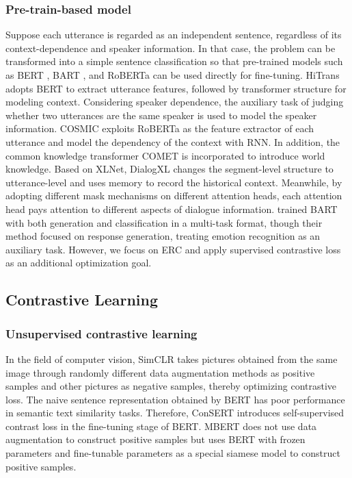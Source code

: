 \documentclass[letterpaper]{article} \usepackage{aaai22}  \usepackage{times}  \usepackage{helvet}  \usepackage{courier}  \usepackage[hyphens]{url}  \usepackage{graphicx} \urlstyle{rm} \def\UrlFont{\rm}  \usepackage{natbib}  \usepackage{caption} \DeclareCaptionStyle{ruled}{labelfont=normalfont,labelsep=colon,strut=off} \frenchspacing  \setlength{\pdfpagewidth}{8.5in}  \setlength{\pdfpageheight}{11in}  \usepackage{algorithm}
\begin{document}
\subsubsection{Pre-train-based model}
Suppose each utterance is regarded as an independent sentence, regardless of its context-dependence and speaker information. In that case, the problem can be transformed into a simple sentence classification so that pre-trained models \cite{ptm_survey} such as BERT \cite{devlin-etal-2019-bert}, BART \cite{lewis-etal-2020-bart}, and RoBERTa \cite{roberta} can be used directly for fine-tuning. HiTrans \cite{li-etal-2020-hitrans} adopts BERT to extract utterance features, followed by transformer structure for modeling context. Considering speaker dependence, the auxiliary task of judging whether two utterances are the same speaker is used to model the speaker information. COSMIC \cite{ghosal-etal-2020-cosmic} exploits RoBERTa as the feature extractor of each utterance and model the dependency of the context with RNN. In addition, the common knowledge transformer COMET \cite{bosse-20-comet} is incorporated to introduce world knowledge. Based on XLNet, DialogXL \cite{dialog-xl} changes the segment-level structure to utterance-level and uses memory to record the historical context. Meanwhile, by adopting different mask mechanisms on different attention heads, each attention head pays attention to different aspects of dialogue information. \citet{gen-and-cls-naacl} trained BART with both generation and classification in a multi-task format, though their method focused on response generation, treating emotion recognition as an auxiliary task. However, we focus on ERC and apply supervised contrastive loss as an additional optimization goal.


\subsection{Contrastive Learning}
\subsubsection{Unsupervised contrastive learning}
In the field of computer vision, SimCLR \cite{ChenK0H20-simclr} takes pictures obtained from the same image through randomly different data augmentation methods as positive samples and other pictures as negative samples, thereby optimizing contrastive loss. The naive sentence representation obtained by BERT has poor performance in semantic text similarity tasks. Therefore, ConSERT \cite{YanLWZWX20-consert} introduces self-supervised contrast loss in the fine-tuning stage of BERT. MBERT \cite{kim-21-mbert} does not use data augmentation to construct positive samples but uses BERT with frozen parameters and fine-tunable parameters as a special siamese model to construct positive samples.
\end{document}
